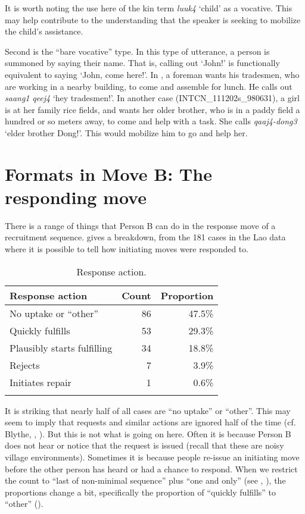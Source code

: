 \documentclass[output=paper]{langsci/langscibook}
\begin{document}
It is worth noting the use here of the kin term \textit{luuk4} ‘child’ as a vocative. This may help contribute to the understanding that the speaker is seeking to mobilize the child’s assistance.

Second is the “bare vocative” type. In this type of utterance, a person is summoned by saying their name. That is, calling out ‘John!’ is functionally equivalent to saying ‘John, come here!’. In , a foreman wants his tradesmen, who are working in a nearby building, to come and assemble for lunch. He calls out \textit{saang1} \textit{qeej4} ‘hey tradesmen!’. In another case (INTCN\_111202s\_980631), a girl is at her family rice fields, and wants her older brother, who is in a paddy field a hundred or so meters away, to come and help with a task. She calls \textit{qaaj4-dong3} ‘elder brother Dong!’. This would mobilize him to go and help her. %

\section{Formats in Move B: The responding move}

There is a range of things that Person B can do in the response move of a recruitment sequence.  gives a breakdown, from the 181 cases in the Lao data where it is possible to tell how initiating moves were responded to.

\begin{table}
\begin{tabularx}{0.75\textwidth}{Xrr}
\lsptoprule
Response action & Count & Proportion \\
\midrule
No uptake or “other” & 86 & 47.5\%\\
Quickly fulfills & 53 & 29.3\%\\
Plausibly starts fulfilling & 34 & 18.8\%\\
Rejects & 7 & 3.9\%\\
Initiates repair & 1 & 0.6\%\\
\lspbottomrule
\end{tabularx}
\caption{Response action.}
\label{tab:enfield:6}
\end{table}

It is striking that nearly half of all cases are “no uptake” or “other”. This may seem to imply that requests and similar actions are ignored half of the time (cf. Blythe, , ). But this is not what is going on here. Often it is because Person B does not hear or notice that the request is issued (recall that these are noisy village environments). Sometimes it is because people re-issue an initiating move before the other person has heard or had a chance to respond. When we restrict the count to “last of non-minimal sequence” plus “one and only” (see , ), the proportions change a bit, specifically the proportion of “quickly fulfills” to “other” ().
\end{document}
